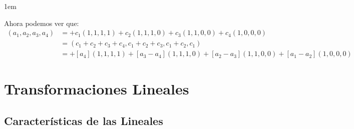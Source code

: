 \documentclass[12pt, fleqn]{report}                             %
\newenvironment{SmallIndentation}[1][0.75em]                    %
        {\begin{adjustwidth}{#1}{}\begin{footnotesize}}             %
        {\end{footnotesize}\end{adjustwidth}}                       %
\theoremstyle{break}                                            %
\begin{document}
\begin{itemize}
\begin{SmallIndentation}[1em]
                            Ahora podemos ver que:
                            \begin{align*}
                                (a_1, a_2, a_3, a_4)
                                    &= 
                                        + c_1 (1, 1, 1, 1)
                                        + c_2 (1, 1, 1, 0)
                                        + c_3 (1, 1, 0, 0)
                                        + c_4 (1, 0, 0, 0)                                  \\
                                    &= 
                                        (c_1+c_2+c_3+c_4, c_1+c_2+c_3, c_1+c_2, c_1)        \\
                                    &= 
                                        + [a_4]       (1, 1, 1, 1)
                                        + [a_3 - a_4] (1, 1, 1, 0)
                                        + [a_2 - a_3] (1, 1, 0, 0)
                                        + [a_1 - a_2] (1, 0, 0, 0)
                            \end{align*}

                        \end{SmallIndentation}

                \end{itemize}
          




\part{Transformaciones Lineales}
\clearpage



    \chapter{Características de las Lineales}


        \clearpage
\end{document}
